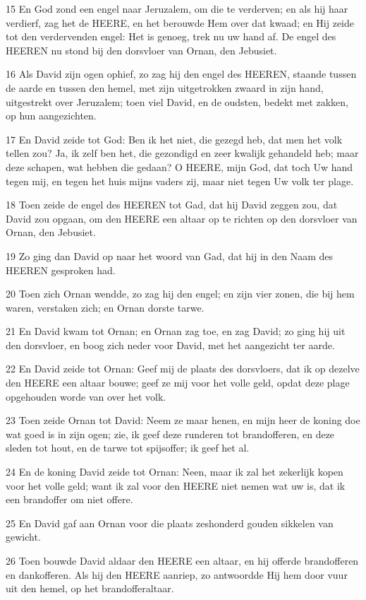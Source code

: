 \par 15 En God zond een engel naar Jeruzalem, om die te verderven; en als hij haar verdierf, zag het de HEERE, en het berouwde Hem over dat kwaad; en Hij zeide tot den verdervenden engel: Het is genoeg, trek nu uw hand af. De engel des HEEREN nu stond bij den dorsvloer van Ornan, den Jebusiet.
\par 16 Als David zijn ogen ophief, zo zag hij den engel des HEEREN, staande tussen de aarde en tussen den hemel, met zijn uitgetrokken zwaard in zijn hand, uitgestrekt over Jeruzalem; toen viel David, en de oudsten, bedekt met zakken, op hun aangezichten.
\par 17 En David zeide tot God: Ben ik het niet, die gezegd heb, dat men het volk tellen zou? Ja, ik zelf ben het, die gezondigd en zeer kwalijk gehandeld heb; maar deze schapen, wat hebben die gedaan? O HEERE, mijn God, dat toch Uw hand tegen mij, en tegen het huis mijns vaders zij, maar niet tegen Uw volk ter plage.
\par 18 Toen zeide de engel des HEEREN tot Gad, dat hij David zeggen zou, dat David zou opgaan, om den HEERE een altaar op te richten op den dorsvloer van Ornan, den Jebusiet.
\par 19 Zo ging dan David op naar het woord van Gad, dat hij in den Naam des HEEREN gesproken had.
\par 20 Toen zich Ornan wendde, zo zag hij den engel; en zijn vier zonen, die bij hem waren, verstaken zich; en Ornan dorste tarwe.
\par 21 En David kwam tot Ornan; en Ornan zag toe, en zag David; zo ging hij uit den dorsvloer, en boog zich neder voor David, met het aangezicht ter aarde.
\par 22 En David zeide tot Ornan: Geef mij de plaats des dorsvloers, dat ik op dezelve den HEERE een altaar bouwe; geef ze mij voor het volle geld, opdat deze plage opgehouden worde van over het volk.
\par 23 Toen zeide Ornan tot David: Neem ze maar henen, en mijn heer de koning doe wat goed is in zijn ogen; zie, ik geef deze runderen tot brandofferen, en deze sleden tot hout, en de tarwe tot spijsoffer; ik geef het al.
\par 24 En de koning David zeide tot Ornan: Neen, maar ik zal het zekerlijk kopen voor het volle geld; want ik zal voor den HEERE niet nemen wat uw is, dat ik een brandoffer om niet offere.
\par 25 En David gaf aan Ornan voor die plaats zeshonderd gouden sikkelen van gewicht.
\par 26 Toen bouwde David aldaar den HEERE een altaar, en hij offerde brandofferen en dankofferen. Als hij den HEERE aanriep, zo antwoordde Hij hem door vuur uit den hemel, op het brandofferaltaar.
